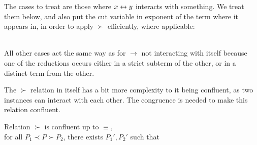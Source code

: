 \begin{myproof}
The cases to treat are those where $x\leftrightarrow y$ interacts with something. We treat them below, and also put the cut variable in exponent of the term where it appears in, in order to apply $\succ$ efficiently, where applicable:\\
\hfill
{}\\
All other cases act the same way as for $\to$ not interacting with itself because one of the reductions occurs either in a strict subterm of the other, or in a distinct term from the other.
\end{myproof}

The $\succ$ relation in itself has a bit more complexity to it being confluent, as two instances can interact with each other. The congruence is needed to make this relation confluent.

\begin{proposition}
Relation $\succ$ is confluent up to $\equiv$,\\
\ie for all $P_1 \prec P \succ P_2$, there exists $P_1',P_2'$ such that\\
\end{proposition}

